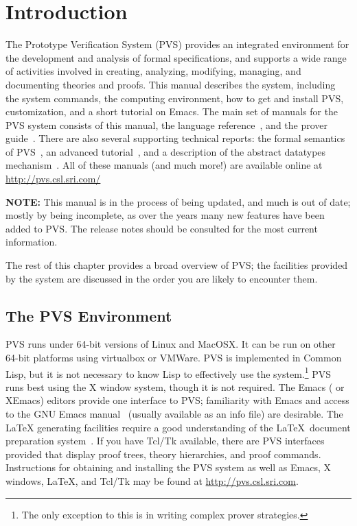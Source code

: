 \chapter{Introduction}
\label{introduction}

The Prototype Verification System (PVS) provides an integrated environment for the development and
analysis of formal specifications, and supports a wide range of activities
involved in creating, analyzing, modifying, managing, and documenting
theories and proofs.  This manual describes the system, including the
system commands, the computing environment, how to get and install PVS,
customization, and a short tutorial on Emacs.  The main set of manuals
for the PVS system consists of this manual, the language
reference~\cite{PVS:language}, and the prover guide~\cite{PVS:prover}.
There are also several supporting technical reports: the formal semantics
of PVS~\cite{PVS:semantics}, an advanced
tutorial~\cite{Rushby&Stringer-Calvert95}, and a description of the
abstract datatypes mechanism~\cite{PVS-ADT:TR}.  All of these manuals (and
much more!) are available online at \url{http://pvs.csl.sri.com/}

\textbf{NOTE:} This manual is in the process of being updated, and much is
out of date; mostly by being incomplete, as over the years many new
features have been added to PVS.  The release notes should be consulted
for the most current information.

The rest of this chapter provides a broad overview of PVS; the facilities
provided by the system are discussed in the order you are likely to
encounter them.

\section*{The PVS Environment}

PVS runs under 64-bit versions of Linux and MacOSX.  It can be run on
other 64-bit platforms using virtualbox or VMWare.  PVS is
implemented in Common Lisp, but it is not necessary to
know Lisp to effectively use the system.\footnote{The only exception to
  this is in writing complex prover strategies.}  PVS runs best using the
X window system, though it is not required.  The Emacs
(\gnuemacs{} or XEmacs) editors provide one
interface to PVS; familiarity with Emacs and access to the GNU Emacs
manual~\cite{emacs20} (usually available as an info file) are desirable.
The \LaTeX{} generating facilities require a good
understanding of the \LaTeX\ document preparation system~\cite{latex2e}.
If you have Tcl/Tk available, there are PVS interfaces provided that
display proof trees, theory hierarchies, and proof commands.  Instructions
for obtaining and installing
the PVS system as well as Emacs, X windows, \LaTeX, and Tcl/Tk may be
found at \url{http://pvs.csl.sri.com}.


